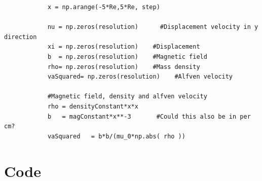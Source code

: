 \documentclass[x11names]{article}
\begin{document}
\begin{itemize}
\begin{lstlisting}
            x = np.arange(-5*Re,5*Re, step)

            nu = np.zeros(resolution)      #Displacement velocity in y direction
            xi = np.zeros(resolution)    #Displacement
            b  = np.zeros(resolution)    #Magnetic field
            rho= np.zeros(resolution)    #Mass density
            vaSquared= np.zeros(resolution)    #Alfven velocity

            #Magnetic field, density and alfven velocity
            rho = densityConstant*x*x
            b   = magConstant*x**-3       #Could this also be in per cm?
            vaSquared   = b*b/(mu_0*np.abs( rho ))
            \end{lstlisting}
      \end{itemize}


\section{Code}

  \label{sec:code}
      

      
\end{document}

